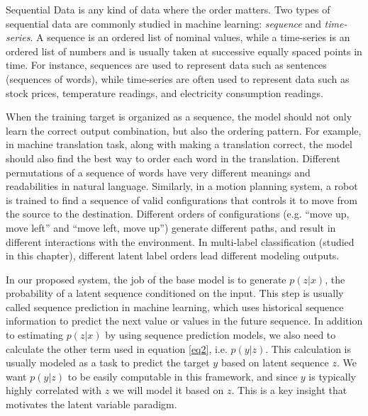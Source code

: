 Sequential Data is any kind of data where the order matters. Two types of sequential data are commonly studied in machine learning: \textit{sequence} and \textit{time-series}. A sequence is an ordered list of nominal values, while a time-series is an ordered list of numbers and is usually taken at successive equally spaced points in time. For instance, sequences are used to represent data such as sentences (sequences of words), while time-series are often used to represent data such as stock prices, temperature readings, and electricity consumption readings. 

When the training target is organized as a sequence, the model should not only learn the correct output combination, but also the ordering pattern. For example, in machine translation task, along with making a translation correct, the model should also find the best way to order each word in the translation. Different permutations of a sequence of words have very different meanings and readabilities in natural language. Similarly, in a motion planning system, a robot is trained to find a sequence of valid configurations that controls it to move from the source to the destination. Different orders of configurations (e.g. ``move up, move left'' and ``move left, move up'') generate different paths, and result in different interactions with the environment. In multi-label classification (studied in this chapter), different latent label orders lead different modeling outputs.

In our proposed system, the job of the base model is to generate $p(z|x)$, the probability of a latent sequence conditioned on the input. This step is usually called sequence prediction in machine learning, which uses historical sequence information to predict the next value or values in the future sequence. In addition to estimating $p(z|x)$ by using sequence prediction models, we also need to calculate the other term used in equation \ref{eq2}, i.e. $p(y|z)$. This calculation is usually modeled as a task to predict the target $y$ based on latent sequence $z$. We want $p(y|z)$ to be easily computable in this framework, and since $y$ is typically highly correlated with $z$ we will model it based on $z$. This is a key insight that motivates the latent variable paradigm. 


